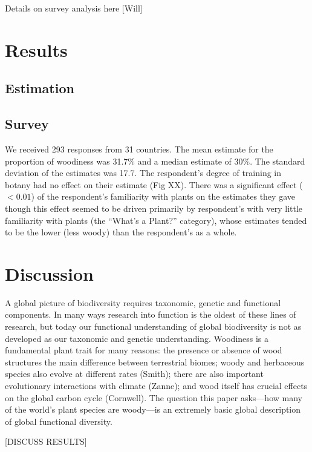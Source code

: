 \documentclass[12pt]{article}
\begin{document}
Details on survey analysis here [Will]


\section{Results}

\subsection{Estimation}

\subsection{Survey}

We received 293 responses from 31 countries. The mean estimate for the proportion of woodiness was 31.7\% and a median estimate of 30\%. The standard deviation of the estimates was 17.7. The respondent's degree of training in botany had no effect on their estimate (Fig XX). There was a significant effect ($<0.01$) of the respondent's  familiarity with plants on the estimates they gave though this effect seemed to be driven primarily by respondent's with very little familiarity with plants (the ``What's a Plant?'' category), whose estimates tended to be the lower (less woody) than the respondent's as a whole.

\section{Discussion}

A global picture of biodiversity requires taxonomic, genetic and functional components.  In many ways research into function is the oldest of these lines of research, but today our functional understanding of global biodiversity is not as developed as our taxonomic and genetic understanding. Woodiness is a fundamental plant trait for many reasons: the presence or absence of wood  structures the main difference between terrestrial biomes; woody and herbaceous species also evolve at different rates (Smith);  there are also important evolutionary interactions with climate (Zanne); and wood itself has crucial effects on the global carbon cycle (Cornwell).  The question this paper asks---how many of the world's plant species are woody---is an extremely basic global description of global functional diversity.

[DISCUSS RESULTS]
\end{document}
